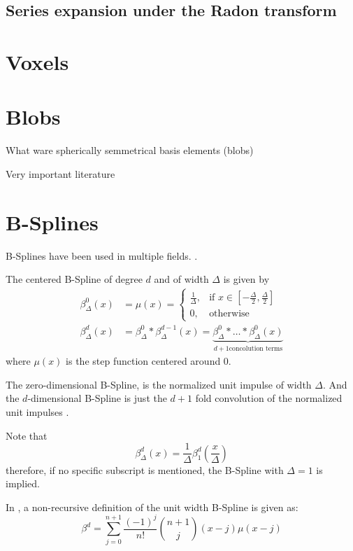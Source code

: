 \subsection{Series expansion under the Radon transform}


\section{Voxels}

\section{Blobs}

What ware spherically semmetrical basis elements (blobs)

Very important literature
\cite{lewitt_alternatives_1992}
\cite{matej_practical_1996}
 
\section{B-Splines}

B-Splines have been used in multiple fields. .

\begin{definition}
    \label{def:bspline}
    The centered B-Spline of degree $d$ and of width $\Delta$ is given by
    \begin{align*}
        \beta_\Delta^0(x) &= \mu(x) = 
            \begin{cases}
                \frac{1}{\Delta}, & \text{if } x \in [-\frac{\Delta}{2}, \frac{\Delta}{2}]\\
                0,           & \text{otherwise}
            \end{cases} \\
           \beta_\Delta^d(x) &= \beta_\Delta^0 * \beta_\Delta^{d-1}(x) = 
               \underbrace{\beta_\Delta^0 * \dots * \beta_\Delta^0(x)}_{d+1 \text{concolution terms}}
    \end{align*}
    where $\mu(x)$ is the step function centered around 0. 

    The zero-dimensional B-Spline, is the normalized unit impulse of width $\Delta$. And the 
    $d$-dimensional B-Spline is just the $d+1$ fold convolution of the normalized unit impulses
    \cite{horbelt_discretization_2002}.

    Note that
    \[ \beta_\Delta^d(x) = \frac{1}{\Delta} \beta_1^d(\frac{x}{\Delta}) \]
    therefore, if no specific subscript is mentioned, the B-Spline with $\Delta = 1$ is implied.

    In \cite{unser_fast_1991}, a non-recursive definition of the unit width B-Spline is given as:
    \[ \beta^d = \sum_{j=0}^{n+1} \frac{(-1)^j}{n!} \binom{n+1}{j}(x - j)\mu(x - j) \] 
\end{definition}

